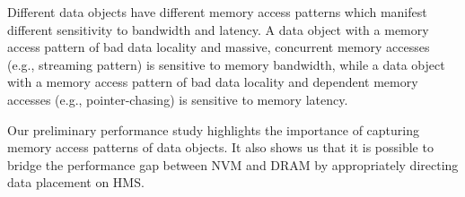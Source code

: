 Different data objects have different memory access patterns which manifest
different sensitivity to bandwidth and latency.
A data object with a memory access pattern of bad data locality and massive, concurrent memory accesses (e.g., streaming pattern) is sensitive
to memory bandwidth, while a data object with a memory access pattern of bad data locality and dependent memory accesses (e.g., pointer-chasing) is sensitive to memory latency. 


\begin{comment}
For example, the data object $p$ is not sensitive to bandwidth and latency limitation of NVM: its data placement in NVM and DRAM does not matter a lot to performance ($\le$ 1.2\% performance difference). 
On the other hand, the data object $a$ is sensitive to bandwidth but not latency (Class D): its data placement in DRAM improves performance by 11\%.
Also, the data object $a$ is sensitive to both bandwidth and latency when using
Class C: its data placement in DRAM improves performance by 13\% (1/2 DRAM bandwidth) and 27\% (4x DRAM latency) respectively.

Further study reveals that the memory accesses to $a$ are dominated by
a streaming memory access pattern and such pattern does not have data dependency between memory accesses. A large memory bandwidth is beneficial for such data object with concurrent memory accesses and few data locality.
This above fact is especially pronounced when we use a larger input problem (Class D).
The memory accesses to $p$ are dominated by indirect data references ($p[colidx[i]]$),
and manifest a random memory access pattern with data reuse. 
\textbf{The size of $p$ is also relatively small (comparing with the last level cache size). As a result, a large body of memory references to $p$ happen in the cache hierarchy. Hence, $p$ is not sensitive to the data placement.}
\end{comment}

Our preliminary performance study highlights the importance of capturing memory
access patterns of data objects. It also shows us that it is possible to bridge the performance gap between NVM and DRAM by appropriately directing data placement on HMS.

\vspace{-10pt}


